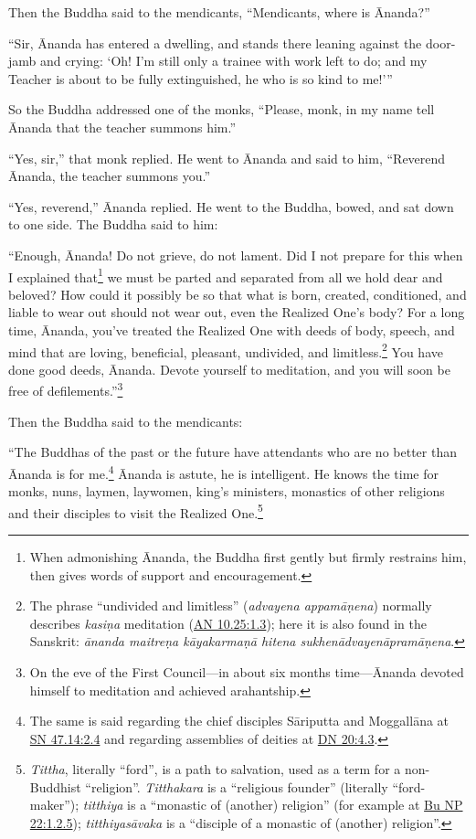 \documentclass[12pt,openany]{book}%
\begin{document}
Then the Buddha said to the mendicants, “Mendicants, where is Ānanda?” 

“Sir, Ānanda has entered a dwelling, and stands there leaning against the door-jamb and crying: ‘Oh! I’m still only a trainee with work left to do; and my Teacher is about to be fully extinguished, he who is so kind to me!’” 

So the Buddha addressed one of the monks, “Please, monk, in my name tell Ānanda that the teacher summons him.” 

“Yes, sir,” that monk replied. He went to Ānanda and said to him, “Reverend Ānanda, the teacher summons you.” 

“Yes, reverend,” Ānanda replied. He went to the Buddha, bowed, and sat down to one side. The Buddha said to him: 

“Enough, Ānanda! Do not grieve, do not lament. Did I not prepare for this when I explained that\footnote{When admonishing Ānanda, the Buddha first gently but firmly restrains him, then gives words of support and encouragement. } we must be parted and separated from all we hold dear and beloved? How could it possibly be so that what is born, created, conditioned, and liable to wear out should not wear out, even the Realized One’s body? For a long time, Ānanda, you’ve treated the Realized One with deeds of body, speech, and mind that are loving, beneficial, pleasant, undivided, and limitless.\footnote{The phrase “undivided and limitless” (\textit{advayena \textsanskrit{appamāṇena}}) normally describes \textit{\textsanskrit{kasiṇa}} meditation (\href{https://suttacentral.net/an10.25/en/sujato\#1.3}{AN 10.25:1.3}); here it is also found in the Sanskrit: \textit{\textsanskrit{ānanda} \textsanskrit{maitreṇa} \textsanskrit{kāyakarmaṇā} hitena \textsanskrit{sukhenādvayenāpramāṇena}}. } You have done good deeds, Ānanda. Devote yourself to meditation, and you will soon be free of defilements.”\footnote{On the eve of the First Council—in about six months time—Ānanda devoted himself to meditation and achieved arahantship. } 

Then the Buddha said to the mendicants: 

“The Buddhas of the past or the future have attendants who are no better than Ānanda is for me.\footnote{The same is said regarding the chief disciples \textsanskrit{Sāriputta} and \textsanskrit{Moggallāna} at \href{https://suttacentral.net/sn47.14/en/sujato\#2.4}{SN 47.14:2.4} and regarding assemblies of deities at \href{https://suttacentral.net/dn20/en/sujato\#4.3}{DN 20:4.3}. } Ānanda is astute, he is intelligent. He knows the time for monks, nuns, laymen, laywomen, king’s ministers, monastics of other religions and their disciples to visit the Realized One.\footnote{\textit{Tittha}, literally “ford”, is a path to salvation, used as a term for a non-Buddhist “religion”. \textit{Titthakara} is a “religious founder” (literally “ford-maker”); \textit{titthiya} is a “monastic of (another) religion” (for example at \href{https://suttacentral.net/pli-tv-bu-vb-np22/en/sujato\#1.2.5}{Bu NP 22:1.2.5}); \textit{\textsanskrit{titthiyasāvaka}} is a “disciple of a monastic of (another) religion”. } 
\end{document}
